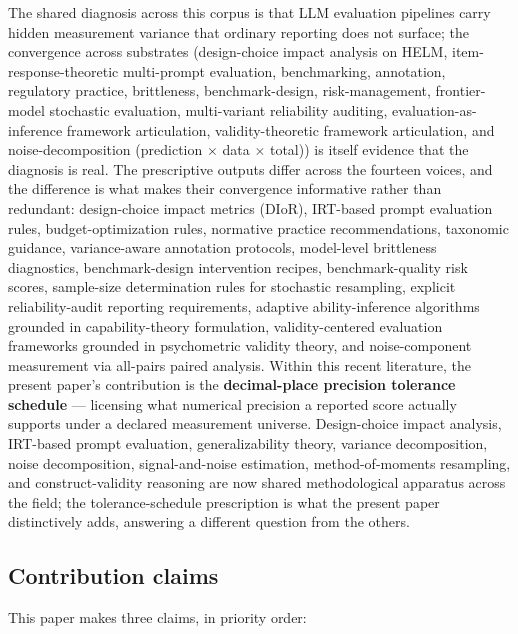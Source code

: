 \documentclass[11pt]{article}
\begin{document}
The shared diagnosis across this corpus is that LLM evaluation pipelines carry hidden measurement variance that ordinary reporting does not surface; the convergence across substrates (design-choice impact analysis on HELM, item-response-theoretic multi-prompt evaluation, benchmarking, annotation, regulatory practice, brittleness, benchmark-design, risk-management, frontier-model stochastic evaluation, multi-variant reliability auditing, evaluation-as-inference framework articulation, validity-theoretic framework articulation, and noise-decomposition (prediction $\times$ data $\times$ total)) is itself evidence that the diagnosis is real. The prescriptive outputs differ across the fourteen voices, and the difference is what makes their convergence informative rather than redundant: design-choice impact metrics (DIoR), IRT-based prompt evaluation rules, budget-optimization rules, normative practice recommendations, taxonomic guidance, variance-aware annotation protocols, model-level brittleness diagnostics, benchmark-design intervention recipes, benchmark-quality risk scores, sample-size determination rules for stochastic resampling, explicit reliability-audit reporting requirements, adaptive ability-inference algorithms grounded in capability-theory formulation, validity-centered evaluation frameworks grounded in psychometric validity theory, and noise-component measurement via all-pairs paired analysis. Within this recent literature, the present paper's contribution is the \textbf{decimal-place precision tolerance schedule} --- licensing what numerical precision a reported score actually supports under a declared measurement universe. Design-choice impact analysis, IRT-based prompt evaluation, generalizability theory, variance decomposition, noise decomposition, signal-and-noise estimation, method-of-moments resampling, and construct-validity reasoning are now shared methodological apparatus across the field; the tolerance-schedule prescription is what the present paper distinctively adds, answering a different question from the others.

\subsection{Contribution claims}
\label{sec:contributions}

This paper makes three claims, in priority order:
\end{document}
